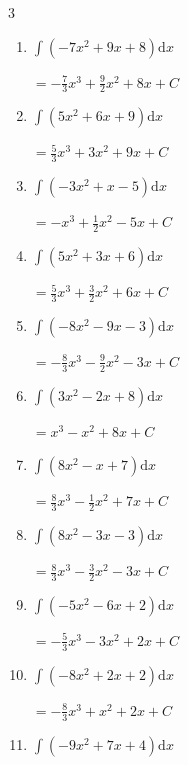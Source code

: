 \begin{multicols}{3}
\begin{enumerate}
  \item $\displaystyle \int \left( -7x^{2}+9x+8 \right) \mathrm{d}x$

        $\displaystyle =-\frac{7}{3}x^{3}+\frac{9}{2}x^{2}+8x+ C$

  \item $\displaystyle \int \left( 5x^{2}+6x+9 \right) \mathrm{d}x$

        $\displaystyle =\frac{5}{3}x^{3}+3x^{2}+9x+ C$

  \item $\displaystyle \int \left( -3x^{2}+x-5 \right) \mathrm{d}x$

        $\displaystyle =-x^{3}+\frac{1}{2}x^{2}-5x+ C$

\columnbreak %

  \item $\displaystyle \int \left( 5x^{2}+3x+6 \right) \mathrm{d}x$

        $\displaystyle =\frac{5}{3}x^{3}+\frac{3}{2}x^{2}+6x+ C$

  \item $\displaystyle \int \left( -8x^{2}-9x-3 \right) \mathrm{d}x$

        $\displaystyle =-\frac{8}{3}x^{3}-\frac{9}{2}x^{2}-3x+ C$

  \item $\displaystyle \int \left( 3x^{2}-2x+8 \right) \mathrm{d}x$

        $\displaystyle =x^{3}-x^{2}+8x+ C$

  \item $\displaystyle \int \left( 8x^{2}-x+7 \right) \mathrm{d}x$

        $\displaystyle =\frac{8}{3}x^{3}-\frac{1}{2}x^{2}+7x+ C$

  \item $\displaystyle \int \left( 8x^{2}-3x-3 \right) \mathrm{d}x$

        $\displaystyle =\frac{8}{3}x^{3}-\frac{3}{2}x^{2}-3x+ C$

  \item $\displaystyle \int \left( -5x^{2}-6x+2 \right) \mathrm{d}x$

        $\displaystyle =-\frac{5}{3}x^{3}-3x^{2}+2x+ C$

  \item $\displaystyle \int \left( -8x^{2}+2x+2 \right) \mathrm{d}x$

        $\displaystyle =-\frac{8}{3}x^{3}+x^{2}+2x+ C$

  \item $\displaystyle \int \left( -9x^{2}+7x+4 \right) \mathrm{d}x$


\end{enumerate}
\end{multicols}
